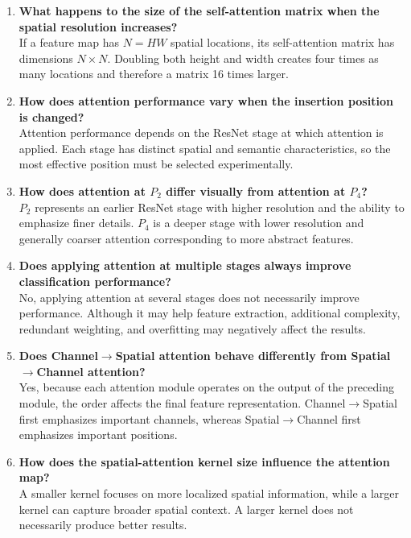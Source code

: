 \documentclass[10pt]{article}
\begin{document}
\begin{enumerate}
\item \textbf{What happens to the size of the self-attention matrix when the spatial resolution increases?}\\
If a feature map has $N=HW$ spatial locations, its self-attention matrix has dimensions $N\times N$. Doubling both height and width creates four times as many locations and therefore a matrix 16 times larger.

\item \textbf{How does attention performance vary when the insertion position is changed?}\\
Attention performance depends on the ResNet stage at which attention is applied. Each stage has distinct spatial and semantic characteristics, so the most effective position must be selected experimentally.

\item \textbf{How does attention at $P_2$ differ visually from attention at $P_4$?}\\
$P_2$ represents an earlier ResNet stage with higher resolution and the ability to emphasize finer details. $P_4$ is a deeper stage with lower resolution and generally coarser attention corresponding to more abstract features.

\item \textbf{Does applying attention at multiple stages always improve classification performance?}\\
No, applying attention at several stages does not necessarily improve performance. Although it may help feature extraction, additional complexity, redundant weighting, and overfitting may negatively affect the results.

\item \textbf{Does Channel$\rightarrow$Spatial attention behave differently from Spatial$\rightarrow$Channel attention?}\\
Yes, because each attention module operates on the output of the preceding module, the order affects the final feature representation. Channel$\rightarrow$Spatial first emphasizes important channels, whereas Spatial$\rightarrow$Channel first emphasizes important positions.

\item \textbf{How does the spatial-attention kernel size influence the attention map?}\\
A smaller kernel focuses on more localized spatial information, while a larger kernel can capture broader spatial context. A larger kernel does not necessarily produce better results.


\end{enumerate}
\end{document}
